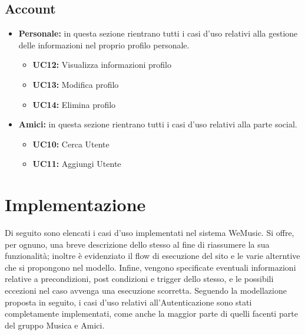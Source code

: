 \subsection{\textbf{Account}}
\begin{itemize}
    \item \textbf{Personale:} in questa sezione rientrano tutti i casi d'uso relativi alla gestione delle informazioni nel proprio profilo personale.
    \begin{itemize}
        \item \textbf{UC12:} Visualizza informazioni profilo 
        \item \textbf{UC13:} Modifica profilo 
        \item \textbf{UC14:} Elimina profilo 
    \end{itemize}
    
    \item \textbf{Amici:} in questa sezione rientrano tutti i casi d'uso relativi alla parte social.
    \begin{itemize}
        \item \textbf{UC10:} Cerca Utente 
        \item \textbf{UC11:} Aggiungi Utente 
    \end{itemize}
\end{itemize}


\newpage
\section{Implementazione}
Di seguito sono elencati i casi d'uso implementati nel sistema WeMusic. Si offre, per ognuno, una breve descrizione dello stesso 
al fine di riassumere la sua funzionalità; inoltre è evidenziato il flow di esecuzione del sito e le varie alterntive che si propongono nel modello.
Infine, vengono specificate eventuali informazioni relative a precondizioni, post condizioni e trigger dello stesso, e le possibili eccezioni nel 
caso avvenga una esecuzione scorretta. 
Seguendo la modellazione proposta in seguito, i casi d'uso relativi all'Autenticazione sono stati completamente implementati, come anche 
la maggior parte di quelli facenti parte del gruppo Musica e Amici. 

\vspace{1cm}
